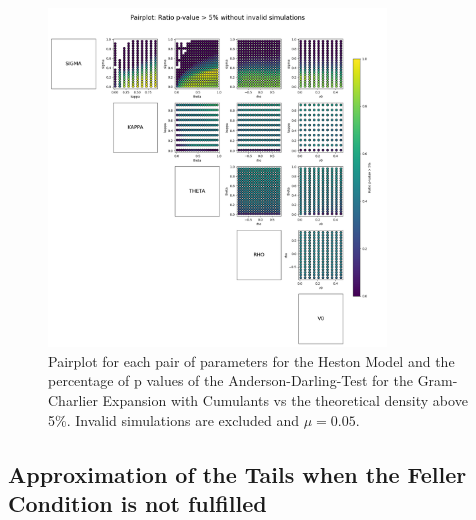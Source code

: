 \begin{figure}
    \centering
    \includegraphics[width=0.8\textwidth]{img/pairplot_GC_cum_AD.png}
    \caption{Pairplot for each pair of parameters for the Heston Model and the percentage of p values of the Anderson-Darling-Test for the Gram-Charlier Expansion with Cumulants vs the theoretical density above 5\%. Invalid simulations are excluded and $\mu=0.05$.}
    \label{fig:pairplot_GC_cum_AD_mu005}
\end{figure}

\subsection{Approximation of the Tails when the Feller Condition is not fulfilled}